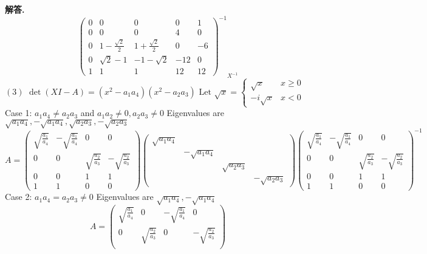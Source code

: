 \documentclass[10pt, a4paper, oneside]{article}
\newenvironment{solution}{\par\noindent\textbf{解答. }}{\par}
\begin{document}
\begin{CJK}{UTF8}{gbsn}
\begin{solution}
$${\begin{pmatrix}
    0 & 0 & 0 & 0 & 1 \\
    0 & 0 & 0 & 4 & 0 \\
    0 & 1 - \frac{\sqrt{2}}{2} & 1 + \frac{\sqrt{2}}{2} & 0 & -6 \\
    0 & \sqrt{2} - 1 &-1 - \sqrt{2}& -12 & 0 \\ 
    1 & 1 & 1 & 12 & 12 
  \end{pmatrix}^{-1}}_{X^{-1}}$$ \newline
  $(3)$ $\det(XI-A) = (x^2-a_1a_4)(x^2-a_2a_3)$ \newline
  $ \text{Let } \sqrt{x} = 
    \begin{cases}
    \sqrt{x} &  x\geq 0 \\
    -i\sqrt{x} & x < 0 
    \end{cases}$ \newline
  Case 1: $a_1 a_4 \neq a_2a_3$ and $a_1a_2 \neq 0, a_2a_3\neq 0$ \newline 
  Eigenvalues are $\sqrt{a_1a_4}, -\sqrt{a_1a_4}, \sqrt{a_2a_3}, -\sqrt{a_2a_3}$ 
  $$ A = \begin{pmatrix}
    \sqrt{\frac{a_1}{a_4}} & -  \sqrt{\frac{a_1}{a_4}} & 0 & 0  \\ 
    0 & 0 &   \sqrt{\frac{a_2}{a_3}} & -   \sqrt{\frac{a_2}{a_3}}\\
    0 & 0 & 1 & 1 \\ 
    1 & 1 & 0 & 0
  \end{pmatrix} \begin{pmatrix}
    \sqrt{a_1a_4} \\ & -\sqrt{a_1a_4} \\ && \sqrt{a_2a_3} \\ &&& -\sqrt{a_2a_3}
  \end{pmatrix} \begin{pmatrix}
    \sqrt{\frac{a_1}{a_4}} & -  \sqrt{\frac{a_1}{a_4}} & 0 & 0  \\ 
    0 & 0 &   \sqrt{\frac{a_2}{a_3}} & -   \sqrt{\frac{a_2}{a_3}}\\
    0 & 0 & 1 & 1 \\ 
    1 & 1 & 0 & 0
  \end{pmatrix}^{-1}$$
  Case 2: $a_1a_4 = a_2a_3 \neq 0$ \newline 
  Eigenvalues are $\sqrt{a_1a_4}, -\sqrt{a_1a_4}$ 
  $$ A = \begin{pmatrix}
    \sqrt{\frac{a_1}{a_4}} & 0 & -  \sqrt{\frac{a_1}{a_4}} & 0 \\
    0 & \sqrt{\frac{a_2}{a_3}} & 0 & -\sqrt{\frac{a_2}{a_3}} \\ 

\end{pmatrix}$$
\end{solution}
\end{CJK}
\end{document}
